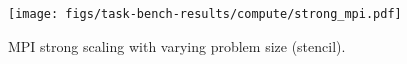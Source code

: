 \begin{figure}[t]
\centering
\texttt{[image: figs/task-bench-results/compute/strong\_mpi.pdf]}
\vspace{-0.7cm}
\caption{MPI strong scaling with varying problem size (stencil).\label{fig:strong-scaling-mpi}}
\vspace{-0.1cm}
\end{figure}
